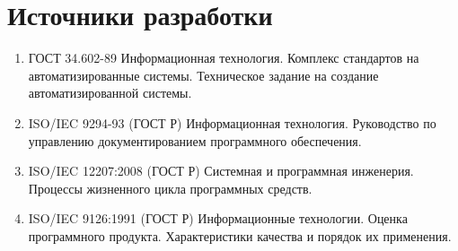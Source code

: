 	\section{Источники разработки}
	\begin{enumerate}


		\item ГОСТ 34.602-89 Информационная технология. Комплекс стандартов на автоматизированные системы. Техническое задание на создание автоматизированной системы.
		\item ISO/IEC 9294-93 (ГОСТ Р) Информационная технология. Руководство по управлению документированием программного обеспечения.
		\item ISO/IEC 12207:2008 (ГОСТ Р) Системная и программная инженерия. Процессы жизненного цикла программных средств.
		\item ISO/IEC 9126:1991 (ГОСТ Р) Информационные технологии. Оценка программного продукта. Характеристики качества и порядок их применения.
	\end{enumerate}